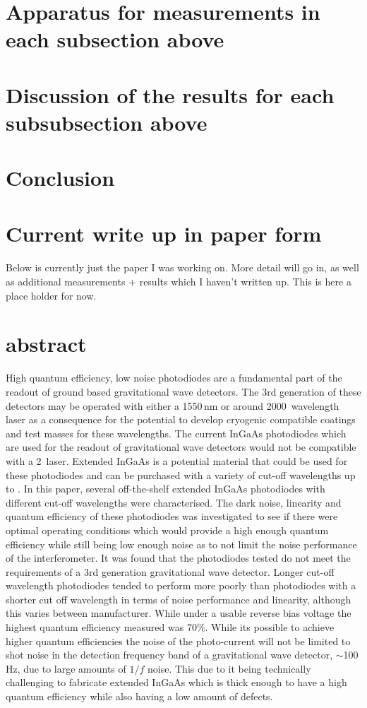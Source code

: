 \section{Apparatus for measurements in each subsection above}
\section{Discussion of the results for each subsubsection above}
\section{Conclusion}
\section{Current write up in paper form}
\paragraph{}
Below is currently just the paper I was working on. More detail will go in, as well as additional measurements + results which I haven't written up. This is here a place holder for now.
\section{abstract}
High quantum efficiency, low noise photodiodes are a fundamental part of the readout of ground based gravitational wave detectors. The 3rd generation of these detectors may be operated with either a 1550\,nm or around 2000\,\SIunits{\nano\metre} wavelength laser as a consequence for the potential to develop cryogenic compatible coatings and test masses for these wavelengths. The current InGaAs photodiodes which are used for the readout of gravitational wave detectors would not be compatible with a 2\,\SIunits{\micro\metre} laser. Extended InGaAs is a potential material that could be used for these photodiodes and can be purchased with a variety of cut-off wavelengths up to . In this paper, several off-the-shelf extended InGaAs photodiodes with different cut-off wavelengths were characterised. The dark noise, linearity and quantum efficiency of these photodiodes was investigated to see if there were optimal operating conditions which would provide a high enough quantum efficiency while still being low enough noise as to not limit the noise performance of the interferometer. It was found that the photodiodes tested do not meet the requirements of a 3rd generation gravitational wave detector. Longer cut-off wavelength photodiodes tended to perform more poorly than photodiodes with a shorter cut off wavelength in terms of noise performance and linearity, although this varies between manufacturer. While under a usable reverse bias voltage the highest quantum efficiency measured was 70\%. While its possible to achieve higher quantum efficiencies the noise of the photo-current will not be limited to shot noise in the detection frequency band of a gravitational wave detector, $\sim$100\,Hz, due to large amounts of $1/f$ noise. This due to it being technically challenging to fabricate extended InGaAs which is thick enough to have a high quantum efficiency while also having a low amount of defects.
